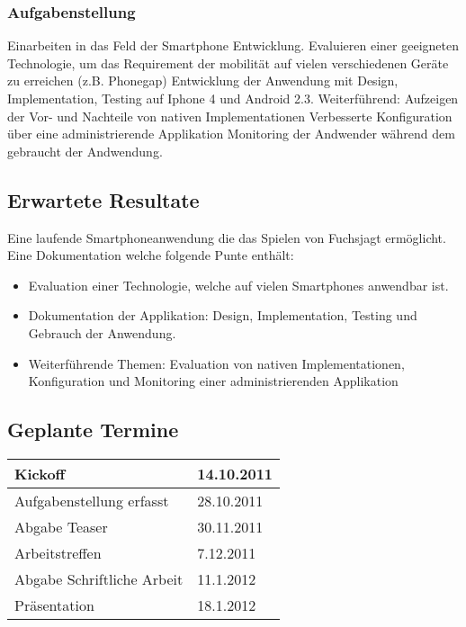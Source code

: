 \subsubsection{Aufgabenstellung} %
\label{ssub:Aufgabenstellung}
Einarbeiten in das Feld der Smartphone Entwicklung.
Evaluieren einer geeigneten Technologie, um das Requirement der mobilität auf vielen verschiedenen Geräte zu erreichen (z.B. Phonegap)
Entwicklung der Anwendung mit Design, Implementation, Testing auf Iphone 4 und Android 2.3.
Weiterführend:
Aufzeigen der Vor- und Nachteile von nativen Implementationen
Verbesserte Konfiguration über eine administrierende Applikation
Monitoring der Andwender während dem gebraucht der Andwendung.

\subsection{Erwartete Resultate} %
\label{sub:Erwartete Resultate}
Eine laufende Smartphoneanwendung die das Spielen von Fuchsjagt ermöglicht.
Eine Dokumentation welche folgende Punte enthält:
\begin{itemize}
    \item Evaluation einer Technologie, welche auf vielen Smartphones anwendbar ist.
    \item Dokumentation der Applikation: Design, Implementation, Testing und Gebrauch der Anwendung.
    \item Weiterführende Themen: Evaluation von nativen Implementationen, Konfiguration und Monitoring einer administrierenden Applikation
\end{itemize}


\subsection{Geplante Termine} %
\label{sub:Geplante Termine}

\begin{tabular}{|l|l|}
\hline
                   Kickoff & 14.10.2011\\
\hline
  Aufgabenstellung erfasst & 28.10.2011\\
\hline
             Abgabe Teaser & 30.11.2011\\
\hline
            Arbeitstreffen &  7.12.2011\\
\hline
Abgabe Schriftliche Arbeit &  11.1.2012\\
\hline
             Präsentation &  18.1.2012\\
\hline
\end{tabular}

